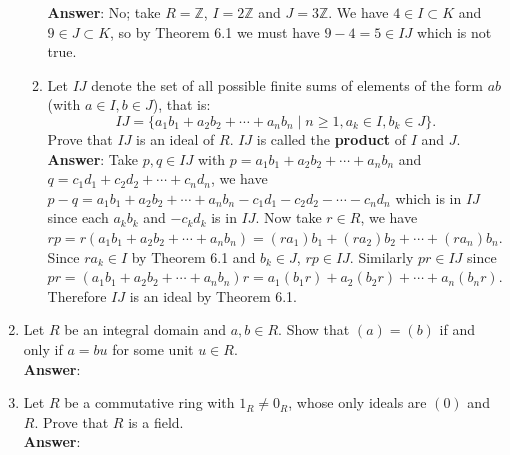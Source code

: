 \documentclass{article}
\begin{document}
\begin{enumerate}
\begin{enumerate}
                        \textbf{Answer}: No; take $R=\mathbb{Z}$, $I=2\mathbb{Z}$ and $J=3\mathbb{Z}$. We have $4\in I\subset K$ and $9\in J\subset K$, so by Theorem 6.1 we must have $9-4=5\in IJ$ which is not true.
                  \item Let $IJ$ denote the set of all possible finite sums of elements of the form $ab$ (with $a\in I, b\in J$), that is: \[IJ=\{a_1b_1+a_2b_2+\cdots+a_nb_n\mid n\geq 1, a_k\in I, b_k\in J\}.\] Prove that $IJ$ is an ideal of $R$. $IJ$ is called the \textbf{product} of $I$ and $J$.\\
                        \textbf{Answer}: Take $p,q\in IJ$ with $p=a_1b_1+a_2b_2+\cdots+a_nb_n$ and $q=c_1d_1+c_2d_2+\cdots+c_nd_n$, we have $p-q=a_1b_1+a_2b_2+\cdots+a_nb_n-c_1d_1-c_2d_2-\cdots-c_nd_n$ which is in $IJ$ since each $a_kb_k$ and $-c_kd_k$ is in $IJ$. Now take $r\in R$, we have $rp=r(a_1b_1+a_2b_2+\cdots+a_nb_n)=(ra_1)b_1+(ra_2)b_2+\cdots+(ra_n)b_n$. Since $ra_k\in I$ by Theorem 6.1 and $b_k\in J$, $rp\in IJ$. Similarly $pr\in IJ$ since $pr=(a_1b_1+a_2b_2+\cdots+a_nb_n)r=a_1(b_1r)+a_2(b_2r)+\cdots+a_n(b_nr)$. Therefore $IJ$ is an ideal by Theorem 6.1.
            \end{enumerate}
      \item Let $R$ be an integral domain and $a,b\in R$. Show that $(a)=(b)$ if and only if $a=bu$ for some unit $u\in R$.\\
            \textbf{Answer}:
      \item Let $R$ be a commutative ring with $1_R\neq 0_R$, whose only ideals are $(0)$ and $R$. Prove that $R$ is a field.\\
            \textbf{Answer}:
\end{enumerate}
\end{document}
